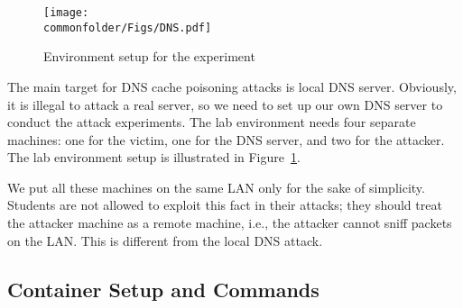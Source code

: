 \begin{figure}[htb]
\centering
\texttt{[image: \\commonfolder/Figs/DNS.pdf]}
\caption{Environment setup for the experiment}
\label{dns:fig:environment}
\end{figure}


The main target for DNS cache poisoning attacks is
local DNS server.  Obviously, it
is illegal to attack a real server, so we need to set up our own DNS
server to  conduct the attack experiments. The lab
environment needs four separate machines:
one for the victim, one for the DNS server, and two for the attacker.
The lab environment setup is illustrated in Figure~\ref{dns:fig:environment}.



%

We put all these machines on the same LAN only for the sake of simplicity. 
Students are not allowed to exploit this fact in their attacks; 
they should treat the attacker machine as a remote machine, 
i.e., the attacker cannot sniff packets on the LAN. 
This is different from the local DNS attack. 


\subsection{Container Setup and Commands}






